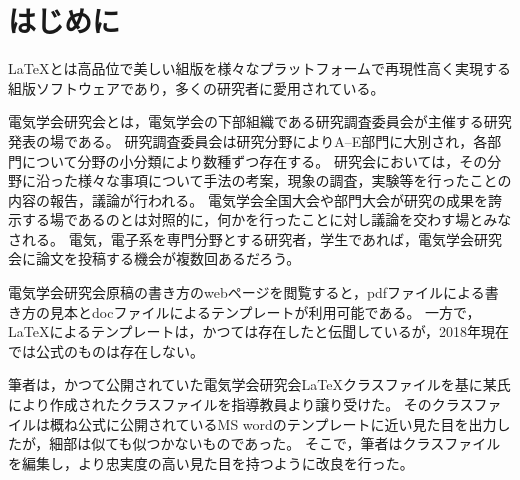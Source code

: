 \documentclass[fleqn]{ieej-tec2}%
\begin{document}
%
\begin{abstract}
The class file \texttt{ieej-tec2.cls} has been developed for typesetting articles of IEEJ technical meeting.
The official class file for the meeting used to exist, however it is no longer available.
Now it becomes a very big problem for \TeX nicians.
I inherited the class file for the technical meeting from my boss, 
and editted some codes in order to achieve higher fidelity to the official MS word template.
Happy \TeX ing!!
\end{abstract}
\maketitle
%
%

\section{はじめに}
\LaTeX{}とは高品位で美しい組版を様々なプラットフォームで再現性高く実現する組版ソフトウェアであり，多くの研究者に愛用されている。

電気学会研究会とは，電気学会の下部組織である研究調査委員会が主催する研究発表の場である。
研究調査委員会は研究分野によりA--E部門に大別され，各部門について分野の小分類により数種ずつ存在する。
研究会においては，その分野に沿った様々な事項について手法の考案，現象の調査，実験等を行ったことの内容の報告，議論が行われる。
電気学会全国大会や部門大会が研究の成果を誇示する場であるのとは対照的に，何かを行ったことに対し議論を交わす場とみなされる。
電気，電子系を専門分野とする研究者，学生であれば，電気学会研究会に論文を投稿する機会が複数回あるだろう。

電気学会研究会原稿の書き方のwebページ\cite{IEEJformat,IEEJformat2021}を閲覧すると，pdfファイルによる書き方の見本とdocファイルによるテンプレートが利用可能である。
一方で，\LaTeX{}によるテンプレートは，かつては存在したと伝聞しているが，2018年現在では公式のものは存在しない。

筆者は，かつて公開されていた電気学会研究会\LaTeX クラスファイルを基に某氏により作成されたクラスファイルを指導教員より譲り受けた。
そのクラスファイルは概ね公式に公開されているMS wordのテンプレートに近い見た目を出力したが，細部は似ても似つかないものであった。
そこで，筆者はクラスファイルを編集し，より忠実度の高い見た目を持つように改良を行った。
\end{document}
